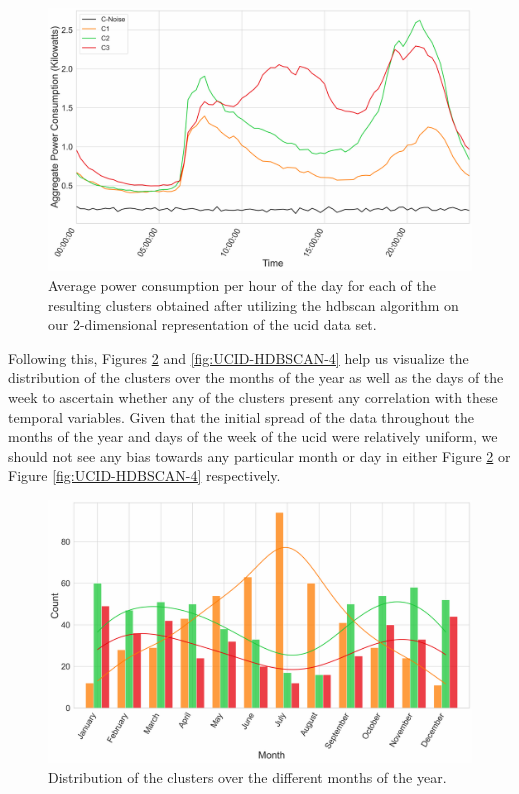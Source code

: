 \begin{adjustwidth}{-1.65cm}{-0.0cm}
\begin{enumerate}[label=Step 2.\arabic*:, leftmargin=*]
        \begin{figure}[hbt!]
            \centering
            \includegraphics[width=\textwidth]{Images/Chapter 6/Stage 2/UCID/UCID-HDBSCAN-2.pdf}
            \caption{Average power consumption per hour of the day for each of the resulting clusters obtained after utilizing the \gls{hdbscan} algorithm on our 2-dimensional representation of the \gls{ucid} data set.}
            \label{fig:UCID-HDBSCAN-2}
        \end{figure}
        
        \noindent \newline Following this, Figures \ref{fig:UCID-HDBSCAN-3} and \ref{fig:UCID-HDBSCAN-4} help us visualize the distribution of the clusters over the months of the year as well as the days of the week to ascertain whether any of the clusters present any correlation with these temporal variables. Given that the initial spread of the data throughout the months of the year and days of the week of the \gls{ucid} were relatively uniform, we should not see any bias towards any particular month or day in either Figure \ref{fig:UCID-HDBSCAN-3} or Figure \ref{fig:UCID-HDBSCAN-4} respectively.
        
        \begin{figure}[H]
            \centering
            \includegraphics[width=\textwidth]{Images/Chapter 6/Stage 2/UCID/UCID-HDBSCAN-3.pdf}
            \caption{Distribution of the clusters over the different months of the year.}
            \label{fig:UCID-HDBSCAN-3}
        \end{figure}
        

\end{enumerate}
\end{adjustwidth}
